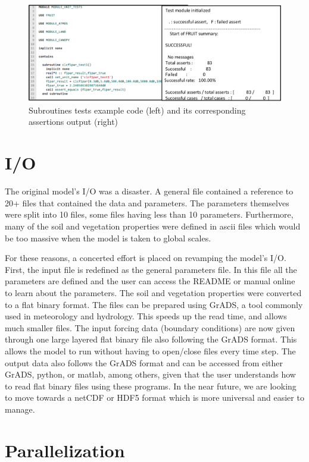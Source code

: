 \documentclass[pdftex,12pt,a4paper]{article}
\begin{document}
\begin{figure}[h]
	\centering
	\includegraphics[width=5.5in]{Figures/Tests2.png}
	\caption{Subroutines tests example code (left) and its corresponding assertions output (right)}
	\label{Tests1}
\end{figure}

\section{I/O}

The original model's I/O was a disaster. A general file contained a reference to 20+ files that contained the data and parameters. The parameters themselves were split into 10 files, some files having less than 10 parameters. Furthermore, many of the soil and vegetation properties were defined in ascii files which would be too massive when the model is taken to global scales. 

For these reasons, a concerted effort is placed on revamping the model's I/O. First, the input file is redefined as the general parameters file. In this file all the parameters are defined and the user can access the README or manual online to learn about the parameters. The soil and vegetation properties were converted to a flat binary format. The files can be prepared using GrADS, a tool commonly used in meteorology and hydrology. This speeds up the read time, and allows much smaller files. The input forcing data (boundary conditions) are now given through one large layered flat binary file also following the GrADS format. This allows the model to run without having to open/close files every time step. The output data also follows the GrADS format and can be accessed from either GrADS, python, or matlab, among others, given that the user understands how to read flat binary files using these programs. In the near future, we are looking to move towards a netCDF or HDF5 format which is more universal and easier to manage.

\section{Parallelization}
\end{document}
